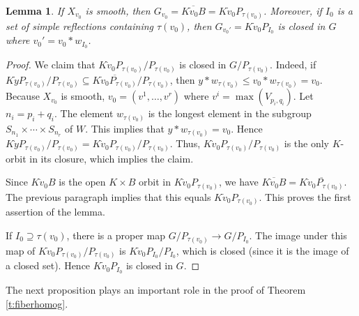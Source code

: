 \documentclass[11pt,letterpaper,reqno]{amsart}
\numberwithin{equation}{section}
\theoremstyle{plain}
\newtheorem{lemma}[theorem]{Lemma}
\theoremstyle{definition}
\theoremstyle{remark}
\begin{document}
\begin{lemma} \label{l:tau-para}
If $X_{v_0}$ is smooth, then $G_{v_0} = \overline{K \dot{v}_0 B} = K \dot{v}_0 P_{\tau(v_0)}$.
Moreover, if $I_0$ is a set of simple reflections containing $\tau(v_0)$, then $G_{v_0'} = K \dot{v}_0 P_{I_0}$ is closed in
$G$ where $v_0'=v_0*w_{I_0}$.
\end{lemma}

\begin{proof}
We claim that $K\dot{v}_0P_{\tau(v_0)}/P_{\tau(v_0)}$ is closed in $G/P_{\tau(v_0)}$.  Indeed, if $K \dot{y} P_{\tau(v_0)}/P_{\tau(v_0)} \subseteq \overline{K\dot{v}_0P_{\tau(v_0)}}/P_{\tau(v_0)}$,
then $y * w_{\tau(v_0)} \leq v_0 * w_{\tau(v_0)} = v_0$.  Because $X_{v_0}$ is smooth, $v_0 = (v^1, \ldots, v^r)$ where $v^i = \max(V_{p_i, q_i})$.  Let $n_i = p_i+q_i$.
The element
 $w_{\tau(v_0)}$ is the longest
element in the subgroup $S_{n_1} \times \cdots \times S_{n_r}$ of $W$.  This implies that $y * w_{\tau(v_0)} = v_0$.  Hence $K \dot{y} P_{\tau(v_0)}/P_{\tau(v_0)} = K \dot{v}_0P_{\tau(v_0)}/P_{\tau(v_0)}$.
Thus, $K\dot{v}_0P_{\tau(v_0)}/P_{\tau(v_0)}$ is the only $K$-orbit in its closure, which implies the claim.

Since $K \dot{v}_0 B$ is the open $K \times B$ orbit in $K \dot{v}_0 P_{\tau(v_0)}$, we have $\overline{K \dot{v}_0 B} = \overline{K \dot{v}_0 P_{\tau(v_0)}}$.
The previous paragraph implies that this equals $K \dot{v}_0 P_{\tau(v_0)}$.  This proves the first assertion of the lemma. 

If $I_0 \supseteq \tau(v_0)$, there is a proper map $G/P_{\tau(v_0)} \to G/P_{I_0}$.  The image under this map of $K \dot{v}_0P_{\tau(v_0)}/P_{\tau(v_0)}$
is $K \dot{v}_0 P_{I_0} /P_{I_0}$, which is closed (since it is the image of a closed set).  Hence $K \dot{v}_0 P_{I_0} $ is closed in $G$.
\end{proof}

The next proposition plays an important role in the proof of Theorem \ref{t:fiberhomog}.
\end{document}
